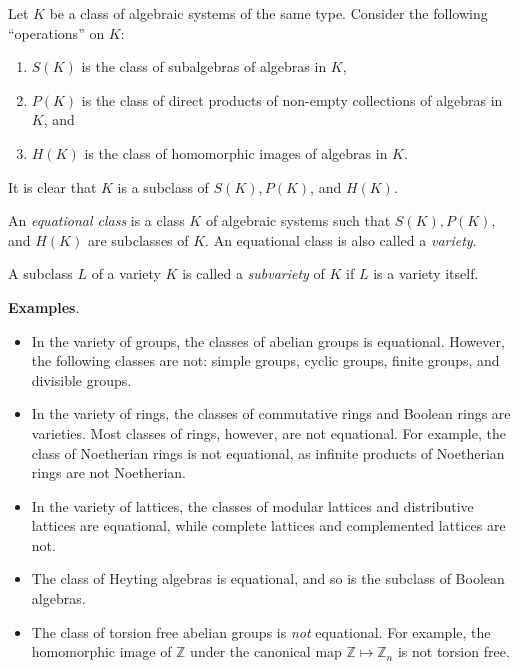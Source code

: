 \documentclass[12pt]{article}
\begin{document}
Let $K$ be a class of algebraic systems of the same type.  Consider the following ``operations'' on $K$:
\begin{enumerate}
\item $S(K)$ is the class of subalgebras of algebras in $K$,
\item $P(K)$ is the class of direct products of non-empty collections of algebras in $K$, and
\item $H(K)$ is the class of homomorphic images of algebras in $K$.
\end{enumerate}

It is clear that $K$ is a subclass of $S(K),P(K)$, and $H(K)$.

An \emph{equational class} is a class $K$ of algebraic systems such that $S(K),P(K)$, and $H(K)$ are subclasses of $K$.  An equational class is also called a \emph{variety}.

A subclass $L$ of a variety $K$ is called a \emph{subvariety} of $K$ if $L$ is a variety itself.

\textbf{Examples}.
\begin{itemize}
\item In the variety of groups, the classes of abelian groups is equational.  However, the following classes are not: simple groups, cyclic groups, finite groups, and divisible groups.
\item In the variety of rings, the classes of commutative rings and Boolean rings are varieties.  Most classes of rings, however, are not equational.  For example, the class of Noetherian rings is not equational, as infinite products of Noetherian rings are not Noetherian.
\item In the variety of lattices, the classes of modular lattices and distributive lattices are equational, while complete lattices and complemented lattices are not.
\item The class of Heyting algebras is equational, and so is the subclass of Boolean algebras.
\item The class of torsion free abelian groups is \emph{not} equational.  For example, the homomorphic image of $\mathbb{Z}$ under the canonical map $\mathbb{Z}\mapsto \mathbb{Z}_n$ is not torsion free.
\end{itemize}
\end{document}
